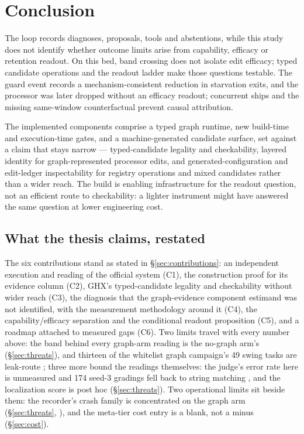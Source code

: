 \section{Conclusion}

The loop records diagnoses, proposals, tools and abstentions, while
this study does not identify whether outcome limits arise from capability,
efficacy or retention readout. On this bed, band crossing does not isolate
edit efficacy; typed candidate operations and the readout ladder make those
questions testable. The guard event records a mechanism-consistent reduction
in starvation exits, and the processor was later dropped without an efficacy
readout; concurrent ships and the missing same-window counterfactual prevent
causal attribution.

The implemented components comprise a typed graph runtime, new
build-time and execution-time gates, and a machine-generated candidate
surface, set against a claim that stays narrow --- typed-candidate legality
and checkability, layered identity for graph-represented processor edits, and
generated-configuration and edit-ledger inspectability for registry operations
and mixed candidates rather than a wider reach. The build is enabling
infrastructure for the readout question,
not an efficient route to checkability: a lighter instrument might have
answered the same question at lower engineering cost.

\subsection*{What the thesis claims, restated}

The six contributions stand as stated in \S\ref{sec:contributions}: an
independent execution and reading of the official system (C1), the
construction proof for its evidence column (C2), GHX's typed-candidate
legality and checkability without wider reach (C3), the diagnosis that the
graph-evidence component estimand was not identified, with the measurement
methodology around it (C4), the capability/efficacy separation and the
conditional readout proposition (C5), and a roadmap attached to measured
gaps (C6). Two limits travel with every
number above: the band behind every graph-arm reading is the no-graph
arm's (\S\ref{sec:threats}), and thirteen of the whitelist graph
campaign's 49 swing tasks are leak-route ; three more bound the
readings themselves: the judge's error rate here is unmeasured and 174
seed-3 gradings fell back to string matching , and the localization
score is post hoc (\S\ref{sec:threats}). Two operational limits sit
beside them: the recorder's crash family is concentrated on the graph arm
(\S\ref{sec:threats}, ), and the meta-tier cost entry is a blank,
not a minus (\S\ref{sec:cost}).

